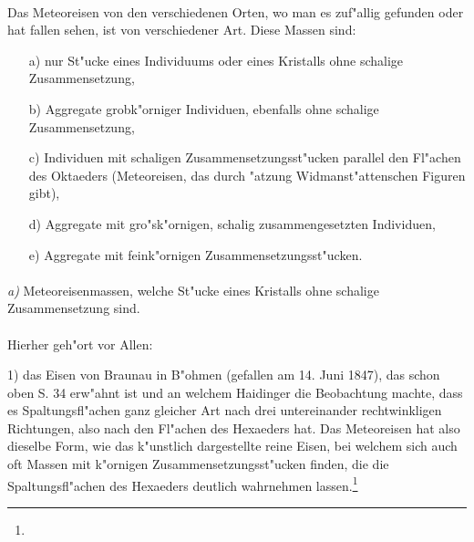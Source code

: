 \documentclass[a4paper, 11pt, oneside]{article}
\begin{document}
\paragraph{}
Das Meteoreisen von den verschiedenen Orten, wo man es zuf"allig gefunden oder hat fallen sehen, ist von verschiedener Art. Diese Massen sind:
\begin{itemize}
  \item[a)] nur St"ucke eines Individuums oder eines Kristalls ohne schalige Zusammensetzung,
  \item[b)] Aggregate grobk"orniger Individuen, ebenfalls ohne schalige Zusammensetzung,
  \item[c)] Individuen mit schaligen Zusammensetzungsst"ucken parallel den Fl"achen des Oktaeders (Meteoreisen, das durch "atzung Widmanst"attenschen Figuren gibt),
  \item[d)] Aggregate mit gro"sk"ornigen, schalig zusammengesetzten Individuen,
  \item[e)] Aggregate mit feink"ornigen Zusammensetzungsst"ucken.
\end{itemize}
\paragraph{}
\emph{a)} Meteoreisenmassen, welche St"ucke eines Kristalls ohne schalige Zusammensetzung sind.
\vspace{\medskipamount}
\paragraph{}
Hierher geh"ort vor Allen:

1) das Eisen von Braunau in B"ohmen (gefallen am 14. Juni 1847), das schon oben S. 34 erw"ahnt ist und an welchem Haidinger die Beobachtung machte, dass es Spaltungsfl"achen ganz gleicher Art nach drei untereinander rechtwinkligen Richtungen, also nach den Fl"achen des Hexaeders hat. Das Meteoreisen hat also dieselbe Form, wie das k"unstlich dargestellte reine Eisen, bei welchem sich auch oft Massen mit k"ornigen Zusammensetzungsst"ucken finden, die die Spaltungsfl"achen des Hexaeders deutlich wahrnehmen lassen.\footnote{}
\end{document}
